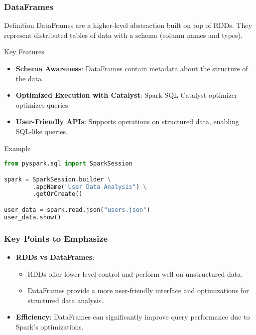 \documentclass[aspectratio=169]{beamer}
\begin{document}
\begin{frame}[fragile]
    \frametitle{DataFrames}
    \begin{block}{Definition}
        DataFrames are a higher-level abstraction built on top of RDDs. They represent distributed tables of data with a schema (column names and types).
    \end{block}
    
    \begin{block}{Key Features}
        \begin{itemize}
            \item \textbf{Schema Awareness}: DataFrames contain metadata about the structure of the data.
            \item \textbf{Optimized Execution with Catalyst}: Spark SQL Catalyst optimizer optimizes queries.
            \item \textbf{User-Friendly APIs}: Supports operations on structured data, enabling SQL-like queries.
        \end{itemize}
    \end{block}

    \begin{block}{Example}
        \begin{lstlisting}[language=Python]
from pyspark.sql import SparkSession

spark = SparkSession.builder \
        .appName("User Data Analysis") \
        .getOrCreate()

user_data = spark.read.json("users.json")
user_data.show()
        \end{lstlisting}
    \end{block}
\end{frame}

\begin{frame}
    \frametitle{Key Points to Emphasize}
    \begin{itemize}
        \item \textbf{RDDs vs DataFrames}:
        \begin{itemize}
            \item RDDs offer lower-level control and perform well on unstructured data.
            \item DataFrames provide a more user-friendly interface and optimizations for structured data analysis.
        \end{itemize}
        \item \textbf{Efficiency}: DataFrames can significantly improve query performance due to Spark's optimizations.
    \end{itemize}
\end{frame}
\end{document}
